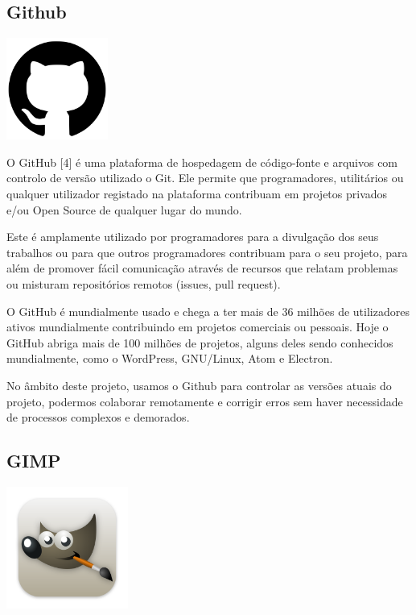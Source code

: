 \documentclass[a4paper,12pt]{article}
\begin{document}
\subsection{Github}
    \includegraphics[width=0.25\textwidth]{github.png} %
    \vspace{0.5cm}

O GitHub [4] é uma plataforma de hospedagem de código-fonte e arquivos com controlo de versão utilizado o Git. Ele permite que programadores, utilitários ou qualquer utilizador registado na plataforma contribuam em projetos privados e/ou Open Source de qualquer lugar do mundo. 

Este é amplamente utilizado por programadores para a divulgação dos seus trabalhos ou para que outros programadores contribuam para o seu projeto, para além de promover fácil comunicação através de recursos que relatam problemas ou misturam repositórios remotos (issues, pull request).

O GitHub é mundialmente usado e chega a ter mais de 36 milhões de utilizadores ativos mundialmente contribuindo em projetos comerciais ou pessoais. Hoje o GitHub abriga mais de 100 milhões de projetos, alguns deles sendo conhecidos mundialmente, como o WordPress, GNU/Linux, Atom e Electron.

No âmbito deste projeto, usamos o Github para controlar as versões atuais do projeto, podermos colaborar remotamente e corrigir erros sem haver necessidade de processos complexos e demorados.

\subsection{GIMP}
    \includegraphics[width=0.3\textwidth]{gimp.png} %
    \vspace{0.5cm}
\end{document}
